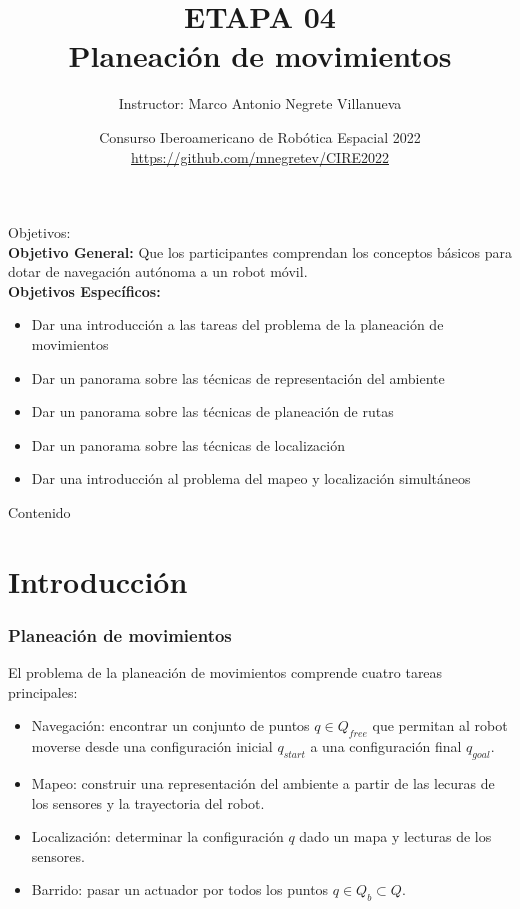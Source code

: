 \documentclass[10pt,spanish,aspectratio=1610]{beamer}
\begin{document}
\renewcommand{\tablename}{Tabla}
\renewcommand{\figurename}{Figura}

\title[Etapa 04 - Navegación]{ETAPA 04\\Planeación de movimientos}
\author[Marco Negrete]{Instructor: Marco Antonio Negrete Villanueva}
\date[CIRE 2022]{Consurso Iberoamericano de Robótica Espacial 2022\\\url{https://github.com/mnegretev/CIRE2022}}

\begin{frame}
\titlepage
\end{frame}

\begin{frame}
  \Large{Objetivos:}
  \normalsize
  \[\]
  \textbf{Objetivo General:} Que los participantes comprendan los conceptos básicos para dotar de navegación autónoma a un robot móvil. 
  \\
  \textbf{Objetivos Específicos:}
  \begin{itemize}
  \item Dar una introducción a las tareas del problema de la planeación de movimientos
  \item Dar un panorama sobre las técnicas de representación del ambiente
  \item Dar un panorama sobre las técnicas de planeación de rutas
  \item Dar un panorama sobre las técnicas de localización 
  \item Dar una introducción al problema del mapeo y localización simultáneos
  \end{itemize}
\end{frame}

\begin{frame}
  \Large{Contenido}
  \normalsize
  \[\]

  \tableofcontents
\end{frame}

\section{Introducción}

\begin{frame}\frametitle{Planeación de movimientos}
  El problema de la planeación de movimientos comprende cuatro tareas principales:
  \begin{itemize}
  \item Navegación: encontrar un conjunto de puntos $q \in Q_{free}$ que permitan al robot moverse desde una configuración inicial $q_{start}$ a una configuración final $q_{goal}$. 
  \item Mapeo: construir una representación del ambiente a partir de las lecuras de los sensores y la trayectoria del robot. 
  \item Localización: determinar la configuración $q$ dado un mapa y lecturas de los sensores. 
  \item Barrido: pasar un actuador por todos los puntos $q\in Q_b \subset Q$.
  \end{itemize}
\end{frame}
\end{document}
